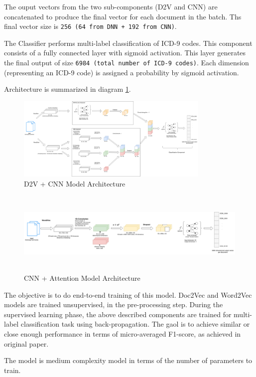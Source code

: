 \documentclass[11pt,a4paper]{article}
\begin{document}
The ouput vectors from the two sub-components (D2V and CNN) are concatenated to produce the final vector for each document in the batch. Ths final vector size is \texttt{256 (64 from DNN + 192 from CNN)}.

The Classifier performs multi-label classification of ICD-9 codes. This component consists of a fully connected layer with sigmoid activation. This layer generates the final output of size \texttt{6984 (total number of ICD-9 codes)}. Each dimension (representing an ICD-9 code) is assigned a probability by sigmoid activation.


Architecture is summarized in diagram \ref{arch_diag}.

\begin{figure}
  \includegraphics[width=\textwidth,height=4cm]{../src/architecture}
  \caption{D2V + CNN Model Architecture}
  \label{arch_diag}
\end{figure}
\begin{figure}
  \includegraphics[width=\textwidth,height=4cm]{../src/architecture2}
  \caption{CNN + Attention Model Architecture}
  \label{arch2_diag}
\end{figure}

The objective is to do end-to-end training of this model. Doc2Vec and Word2Vec models are trained unsupervised, in the pre-processing step. During the supervised learning phase, the above described components are trained for multi-label classification task using back-propagation. The gaol is to achieve similar or close enough performance in terms of micro-averaged F1-score, as achieved in original paper.

The model is medium complexity model in terms of the number of parameters to train.
\newline
\end{document}
